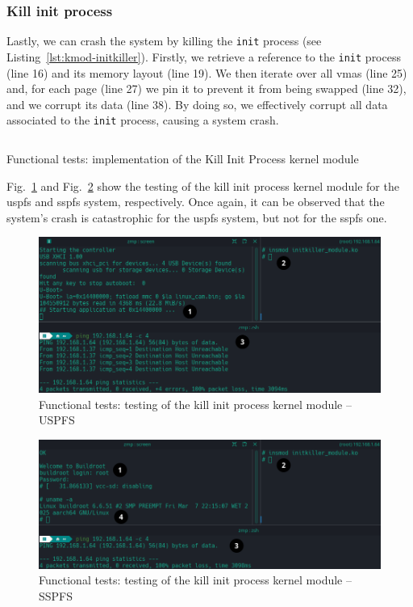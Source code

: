 \subsubsection{Kill init process}
\label{sec:kill-init-process}
Lastly, we can crash the system by killing the \lstinline{init} process (see
Listing~\ref{lst:kmod-initkiller}). Firstly, we retrieve a reference to the
\lstinline{init} process (line 16) and its memory layout (line 19). We then
iterate over all \glspl{vma} (line 25) and, for each page (line 27) we pin it to
prevent it from being swapped (line 32), and we corrupt its data (line 38). By
doing so, we effectively corrupt all data associated to the \lstinline{init}
process, causing a system crash.

\begin{longlisting}
\centering
\inputminted[]{c}{./listing/kmod_initkiller.c}
\caption{Functional tests: implementation of the Kill Init Process kernel module}
\label{lst:kmod-initkiller}
\end{longlisting}

Fig.~\ref{fig:kmod-initkiller-test} and Fig.~\ref{fig:kmod-initkiller-test-bao} show the
    testing of the kill init process kernel module for the \gls{uspfs} and
\gls{sspfs} system, respectively. Once again, it can be observed that the
system's crash is catastrophic for the \gls{uspfs} system, but not for the
\gls{sspfs} one.

\begin{figure}[!hbt]
  \centering
  \includegraphics[width=1.0\textwidth]{./img/png/kmod-initkiller-test-annot} 
  \caption{Functional tests: testing of the kill init process kernel module -- USPFS}%
  \label{fig:kmod-initkiller-test}
\end{figure}

\begin{figure}[!hbt]
  \centering
  \includegraphics[width=1.0\textwidth]{./img/png/kmod-initkiller-test-bao-annot} 
  \caption{Functional tests: testing of the kill init process kernel module -- SSPFS}%
  \label{fig:kmod-initkiller-test-bao}
\end{figure}

